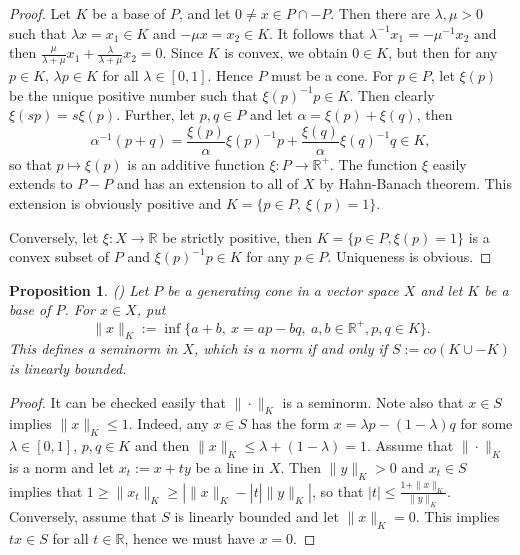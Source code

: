 \documentclass[12pt]{article}
\newtheorem{prop}{Proposition}
\theoremstyle{remark}
\newcommand{\<}{\langle}
\begin{document}
\begin{proof} Let $K$ be a base of $P$, and let $0\neq x\in P\cap -P$. Then there are $\lambda,\mu >0$ such that $\lambda x=x_1\in K$ and $-\mu x=x_2\in K$.  
It follows that $\lambda^{-1}x_1=-\mu^{-1}x_2$ and then  $\tfrac{\mu}{\lambda+\mu}x_1+\tfrac{\lambda}{\lambda+\mu}x_2=0$. Since $K$ is convex, we obtain $0\in K$, but then 
 for any $p\in K$,  $\lambda p\in K$ for all $\lambda\in[0,1]$. Hence $P$ must be a cone.  For $p\in P$, let $\xi(p)$ be the unique positive number such that 
$\xi(p)^{-1}p\in K$. Then clearly $\xi(sp)=s\xi(p)$. Further, let $p,q\in P$ and let $\alpha=\xi(p)+\xi(q)$, then 
\[
\alpha^{-1}(p+q)=\frac{\xi(p)}{\alpha} \xi(p)^{-1}p+ \frac{\xi(q)}{\alpha} \xi(q)^{-1}q\in K,
\]
so that  $p\mapsto \xi(p)$ is an additive function  $\xi: P\to \mathbb R^+$. The function $\xi$ easily extends to $P-P$ and has an extension to all of $X$ by Hahn-Banach theorem. This extension is obviously positive and $K=\{p\in P,\ \xi(p)=1\}$.  

Conversely, let $\xi:X\to \mathbb R$ be strictly positive, then $K=\{p\in P, \xi(p)=1\}$ is a convex subset of $P$ and $\xi(p)^{-1}p\in K$ for any $p\in P$. Uniqueness is obvious. 



\end{proof}



\begin{prop} (\cite{ellis}) Let $P$ be a generating cone in a vector space $X$ and let $K$ be a base of $P$. For $x\in X$, put 
\[
\|x\|_K:=\inf\{a+b,\ x=a p-b q,\ a,b\in \mathbb R^+, p,q\in K\}.
\]
This defines a seminorm in $X$, which is a norm if and only if $S:=co(K\cup -K)$ is linearly bounded. 

\end{prop}

\begin{proof}
It can be checked easily that $\|\cdot\|_K$ is a seminorm. Note also that $x\in S$ implies $\|x\|_K\le 1$. Indeed, any $x\in S$ has the form $x=\lambda p-(1-\lambda)q$ for some  $\lambda\in [0,1]$, $p,q\in K$ and then  $\|x\|_K\le \lambda+(1-\lambda)=1$.  
Assume that $\|\cdot\|_K$ is a norm and let $x_t:=x+ty$ be a line in $X$. Then $\|y\|_K>0$ and $x_t\in  S$ implies that $1\ge \|x_t\|_K\ge |\|x\|_K-|t|\|y\|_K|$, so that $|t|\le \tfrac{1+\|x\|_K}{\|y\|_K}$. Conversely, assume that $S$ is linearly bounded and let $\|x\|_K=0$. This implies $tx\in S$ for all $t\in \mathbb R$, hence we must have 
$x=0$. 
 

\end{proof}
\end{document}

